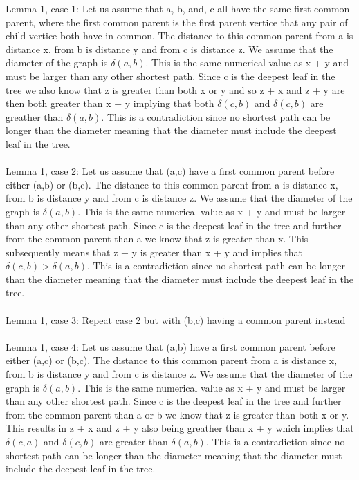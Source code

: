 \documentclass[11pt]{article}
\begin{document}
\begin{enumerate}
    Lemma 1, case 1: Let us assume that a, b, and, c all have the same first common parent, where the first common parent is the first parent vertice that any pair of child vertice both have in common. The distance to this common parent from a is distance x, from b is distance y and from c is distance z. We assume that the diameter of the graph is $\delta(a,b)$. This is the same numerical value as x + y and must be larger than any other shortest path. Since c is the deepest leaf in the tree we also know that z is greater than both x or y and so z + x and z + y are then both greater than x + y implying that both $\delta(c,b)$ and $\delta(c,b)$ are greather than $\delta(a,b)$. This is a contradiction since no shortest path can be longer than the diameter meaning that the diameter must include the deepest leaf in the tree.\\\\
    Lemma 1, case 2: Let us assume that (a,c) have a first common parent before either (a,b) or (b,c). The distance to this common parent from a is distance x, from b is distance y and from c is distance z. We assume that the diameter of the graph is $\delta(a,b)$. This is the same numerical value as x + y and must be larger than any other shortest path. Since c is the deepest leaf in the tree and further from the common parent than a we know that z is greater than x. This subsequently means that z + y is greater than x + y and implies that $\delta(c,b) > \delta(a,b)$. This is a contradiction since no shortest path can be longer than the diameter meaning that the diameter must include the deepest leaf in the tree.\\\\
    Lemma 1, case 3: Repeat case 2 but with (b,c) having a common parent instead\\\\
    Lemma 1, case 4: Let us assume that (a,b) have a first common parent before either (a,c) or (b,c). The distance to this common parent from a is distance x, from b is distance y and from c is distance z.  We assume that the diameter of the graph is $\delta(a,b)$. This is the same numerical value as x + y and must be larger than any other shortest path. Since c is the deepest leaf in the tree and further from the common parent than a or b we know that z is greater than both x or y. This results in z + x and z + y also being greather than x + y which implies that $\delta(c,a)$ and $\delta(c,b)$ are greater than $\delta(a,b)$. This is a contradiction since no shortest path can be longer than the diameter meaning that the diameter must include the deepest leaf in the tree.


\end{enumerate}
\end{document}
